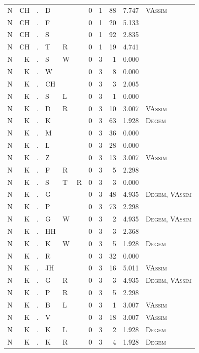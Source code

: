 \documentclass[12pt]{article}
\begin{document}
\begin{longtable}{r@{ } r@{ } c@{ } l@{ } l@{ } l@{ } r r r r l }
N & CH & . & D &  &  & 0 & 1 & 88 & 7.747 & \textsc{VAssim} \\
N & CH & . & F &  &  & 0 & 1 & 20 & 5.133 &  \\
N & CH & . & S &  &  & 0 & 1 & 92 & 2.835 &  \\
N & CH & . & T & R &  & 0 & 1 & 19 & 4.741 &  \\
N & K & . & S & W &  & 0 & 3 & 1 & 0.000 &  \\
N & K & . & W &  &  & 0 & 3 & 8 & 0.000 &  \\
N & K & . & CH &  &  & 0 & 3 & 3 & 2.005 &  \\
N & K & . & S & L &  & 0 & 3 & 1 & 0.000 &  \\
N & K & . & D & R &  & 0 & 3 & 10 & 3.007 & \textsc{VAssim} \\
N & K & . & K &  &  & 0 & 3 & 63 & 1.928 & \textsc{Degem} \\
N & K & . & M &  &  & 0 & 3 & 36 & 0.000 &  \\
N & K & . & L &  &  & 0 & 3 & 28 & 0.000 &  \\
N & K & . & Z &  &  & 0 & 3 & 13 & 3.007 & \textsc{VAssim} \\
N & K & . & F & R &  & 0 & 3 & 5 & 2.298 &  \\
N & K & . & S & T & R & 0 & 3 & 3 & 0.000 &  \\
N & K & . & G &  &  & 0 & 3 & 48 & 4.935 & \textsc{Degem}, \textsc{VAssim} \\
N & K & . & P &  &  & 0 & 3 & 73 & 2.298 &  \\
N & K & . & G & W &  & 0 & 3 & 2 & 4.935 & \textsc{Degem}, \textsc{VAssim} \\
N & K & . & HH &  &  & 0 & 3 & 3 & 2.368 &  \\
N & K & . & K & W &  & 0 & 3 & 5 & 1.928 & \textsc{Degem} \\
N & K & . & R &  &  & 0 & 3 & 32 & 0.000 &  \\
N & K & . & JH &  &  & 0 & 3 & 16 & 5.011 & \textsc{VAssim} \\
N & K & . & G & R &  & 0 & 3 & 3 & 4.935 & \textsc{Degem}, \textsc{VAssim} \\
N & K & . & P & R &  & 0 & 3 & 5 & 2.298 &  \\
N & K & . & B & L &  & 0 & 3 & 1 & 3.007 & \textsc{VAssim} \\
N & K & . & V &  &  & 0 & 3 & 18 & 3.007 & \textsc{VAssim} \\
N & K & . & K & L &  & 0 & 3 & 2 & 1.928 & \textsc{Degem} \\
N & K & . & K & R &  & 0 & 3 & 4 & 1.928 & \textsc{Degem} \\

\end{longtable}
\end{document}
